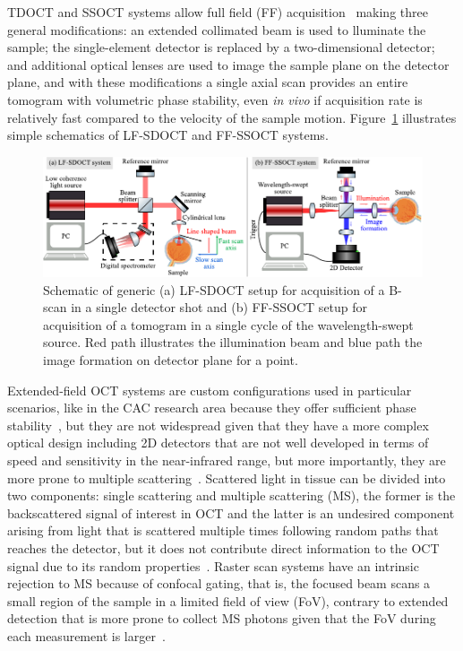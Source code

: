 TDOCT and SSOCT systems allow full field (FF) acquisition~\cite{Dubois2002_Highresolution, Hillmann2016_Aberrationfree} making three general modifications: an extended collimated beam is used to lluminate the sample; the single-element detector is replaced by a two-dimensional detector; and additional optical lenses are used to image the sample plane on the detector plane, and with these modifications a single axial scan provides an entire tomogram with volumetric phase stability, even \textit{in vivo} if acquisition rate is relatively fast compared to the velocity of the sample motion. Figure~\ref{fig:LF_FFOCT_Scheme} illustrates simple schematics of LF-SDOCT and FF-SSOCT systems.

\begin{figure}[htb!]
    \centering
    \includegraphics[width=\textwidth]{Figures/TheoreticalBasis/LF_FFOCT_Scheme.pdf}
    \caption[Schematic of generic LF-SDOCT and FF-OSCT setups.]{Schematic of generic (a) LF-SDOCT setup for acquisition of a B-scan in a single detector shot and (b) FF-SSOCT setup for acquisition of a tomogram in a single cycle of the wavelength-swept source. Red path illustrates the illumination beam and blue path the image formation on detector plane for a point.}
    \label{fig:LF_FFOCT_Scheme}
\end{figure}

Extended-field OCT systems are custom configurations used in particular scenarios, like in the CAC research area because they offer sufficient phase stability~\cite{Kumar2013_Subaperture, Hillmann2016_Aberrationfree}, but they are not widespread given that they have a more complex optical design including 2D detectors that are not well developed in terms of speed and sensitivity in the near-infrared range, but more importantly, they are more prone to multiple scattering~\cite{Karamata2005_Multiple}. Scattered light in tissue can be divided into two components: single scattering and multiple scattering (MS), the former is the backscattered signal of interest in OCT and the latter is an undesired component arising from light that is scattered multiple times following random paths that reaches the detector, but it does not contribute direct information to the OCT signal due to its random properties~\cite{Karamata2005_Multiple-1}. Raster scan systems have an intrinsic rejection to MS because of confocal gating, that is, the focused beam scans a small region of the sample in a limited field of view (FoV), contrary to extended detection that is more prone to collect MS photons given that the FoV during each measurement is larger~\cite{Karamata2005_Multiple}.

